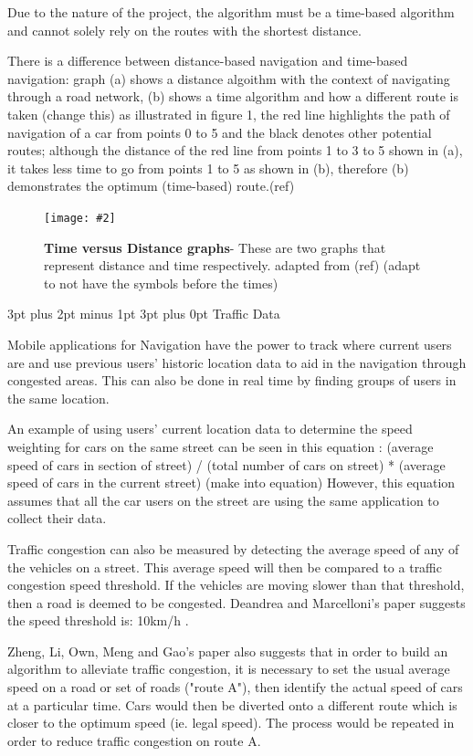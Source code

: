\documentclass[12pt,a4paper]{article}
\makeatletter
\newcommand{\figuremacro}[5]{
    \begin{figure}[#1]
        \centering
        \texttt{[image: \#2]}
        \caption[#3]{\textbf{#3}#4}
        \label{fig:#2}
    \end{figure}
}
\renewcommand\subsection{\@startsection {subsection}{1}{0mm} %
                               {3pt plus 2pt minus 1pt} %
                               {3pt plus 0pt} %
                               {\normalfont\bfseries}}
\makeatother
\begin{document}
Due to the nature of the project, the algorithm must be a time-based algorithm and cannot solely rely on the routes with the shortest distance.

There is a difference between distance-based navigation and time-based navigation: graph (a) shows a distance algoithm with the context of navigating through a road network, (b) shows a time algorithm and how a different route is taken (change this) as illustrated in figure 1, the red line highlights the path of navigation of a car from points 0 to 5 and the black denotes other potential routes; although the distance 
of the red line from points 1 to 3 to 5 shown in (a), it takes less time to go from points 1 to 5 as shown in (b), therefore (b) demonstrates the optimum (time-based) route.(ref)


\figuremacro{h}{TimevsDistanceWeightFactors}{Time versus Distance graphs}{- These are two graphs that represent distance and time respectively. adapted from (ref) (adapt to not have the symbols before the times)}{0.6} 

\subsection{Traffic Data}

Mobile applications for Navigation have the power to track where current users are and use previous users’ historic location data to aid in the navigation through congested areas. This can also be done in real time by finding groups of users in the same location.

An example of using users’ current location data to determine the speed weighting for cars on the same street can be seen in this equation \cite{Zheng2018}: (average speed of cars in section of street) / (total number of cars on street) * (average speed of cars in the current street) (make into equation) However, this equation assumes that all the car users on the street are using the same application to collect their data. 

Traffic congestion can also be measured by detecting the average speed of any of the vehicles on a street. This average speed will then be compared to a traffic congestion speed threshold. If the vehicles are moving slower than that threshold, then a road is deemed to be congested. Deandrea and Marcelloni’s paper suggests the speed threshold is: 10km/h \cite{DAndrea2017}.

Zheng, Li, Own, Meng and Gao’s paper also suggests that in order to build an algorithm to alleviate traffic congestion, it is necessary to set the usual average speed on a road or set of roads ("route A"), then identify the actual speed of cars at a particular time. Cars would then be diverted onto a different route which is closer to the optimum speed (ie. legal speed). The process would be repeated in order to reduce traffic congestion on route A. \cite{Zheng2018}
\end{document}
